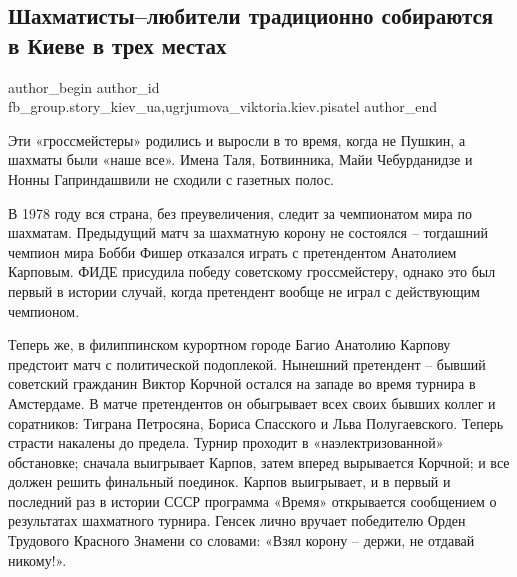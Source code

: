  
 
 
 
 
 
\subsection{Шахматисты–любители традиционно собираются в Киеве в трех местах}
\label{sec:20_03_2021.fb.fb_group.story_kiev_ua.1.chess}
 
\ifcmt
 author_begin
   author_id fb_group.story_kiev_ua,ugrjumova_viktoria.kiev.pisatel
 author_end
\fi

Эти «гроссмейстеры» родились и выросли в то время, когда не Пушкин, а шахматы
были «наше все». Имена Таля, Ботвинника, Майи Чебурданидзе и Нонны
Гаприндашвили не сходили с газетных полос. 


В 1978 году вся страна, без преувеличения, следит за чемпионатом мира по
шахматам. Предыдущий матч за шахматную корону не состоялся – тогдашний чемпион
мира Бобби Фишер отказался играть с претендентом Анатолием Карповым. ФИДЕ
присудила победу советскому гроссмейстеру, однако это был первый в истории
случай, когда претендент вообще не играл с действующим чемпионом.

Теперь же, в филиппинском курортном городе Багио Анатолию Карпову предстоит
матч с политической подоплекой. Нынешний претендент – бывший советский
гражданин Виктор Корчной остался на западе во время турнира в Амстердаме. В
матче претендентов он обыгрывает всех своих бывших коллег и соратников: Тиграна
Петросяна, Бориса Спасского и Льва Полугаевского. Теперь страсти накалены до
предела. Турнир проходит в «наэлектризованной» обстановке; сначала выигрывает
Карпов, затем вперед вырывается Корчной; и все должен решить финальный
поединок. Карпов выигрывает, и в первый и последний раз в истории СССР
программа «Время» открывается сообщением о результатах шахматного турнира.
Генсек лично вручает победителю Орден Трудового Красного Знамени со словами:
«Взял корону – держи, не отдавай никому!».  

